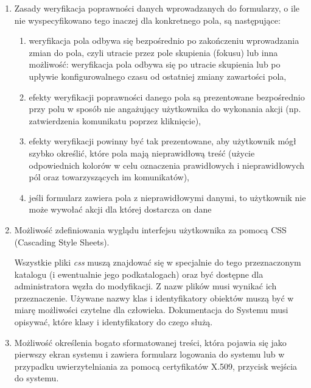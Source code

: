 \documentclass[a4paper]{report}
\begin{document}
\begin{enumerate}
  \item Zasady weryfikacja poprawności danych wprowadzanych do formularzy, o ile
  nie wyspecyfikowano tego inaczej dla konkretnego pola, są następujące:
  \begin{enumerate}
    \item weryfikacja pola odbywa się bezpośrednio po zakończeniu wprowadzania zmian do pola, czyli utracie przez pole skupienia (fokusu)
    lub inna możliwość: weryfikacja pola odbywa się po utracie skupienia lub po upływie konfigurowalnego czasu od ostatniej zmiany zawartości pola,
    \item efekty weryfikacji poprawności danego pola są prezentowane bezpośrednio przy polu w sposób nie angażujący użytkownika do wykonania
    akcji (np. zatwierdzenia komunikatu poprzez kliknięcie),
    \item efekty weryfikacji powinny być tak prezentowane, aby użytkownik mógł szybko określić, które pola mają
    nieprawidłową treść (użycie odpowiednich kolorów w celu oznaczenia prawidłowych i nieprawidłowych pól oraz towarzyszących
    im komunikatów),
    \item jeśli formularz zawiera pola z nieprawidłowymi danymi, to użytkownik nie może wywołać akcji dla której dostarcza on dane
  \end{enumerate}

  \item Możliwość zdefiniowania wyglądu interfejsu użytkownika za pomocą CSS (Cascading Style Sheets).

  Wszystkie pliki \emph{css} muszą znajdować się w specjalnie do tego przeznaczonym katalogu (i ewentualnie
  jego podkatalogach) oraz być dostępne dla administratora węzła do modyfikacji. Z nazw plików musi wynikać
  ich przeznaczenie. Używane nazwy klas i identyfikatory obiektów muszą być w miarę możliwości czytelne
  dla człowieka. Dokumentacja do Systemu musi opisywać, które klasy i identyfikatory do czego służą.

  \item Możliwość określenia bogato sformatowanej treści, która pojawia się jako pierwszy ekran systemu
  i zawiera formularz logowania do systemu lub w przypadku uwierzytelniania za pomocą certyfikatów X.509,
  przycisk wejścia do systemu.

\end{enumerate}


\end{document}
